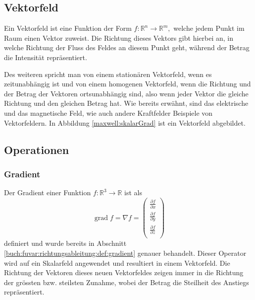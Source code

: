 \subsection{Vektorfeld\label{maxwell:vektorfeld}}

Ein Vektorfeld ist eine Funktion der Form \( f\colon \mathbb{R}^n \rightarrow \mathbb{R}^m, \) welche jedem Punkt im Raum einen Vektor zuweist. 
%
Die Richtung dieses Vektors gibt hierbei an, in welche Richtung der Fluss des Feldes an diesem Punkt geht, während der Betrag die Intensität repräsentiert.


Des weiteren spricht man von einem stationären Vektorfeld, wenn es zeitunabhängig ist und von einem homogenen Vektorfeld, wenn die Richtung und der Betrag der Vektoren ortsunabhängig sind, also wenn jeder Vektor die gleiche Richtung und den gleichen Betrag hat. 
Wie bereits erwähnt, sind das elektrische und das magnetische Feld, wie auch andere Kraftfelder Beispiele von Vektorfeldern.
In Abbildung \ref{maxwell:skalarGrad} ist ein Vektorfeld abgebildet.

\subsection{Operationen}

\subsubsection{Gradient}
%
Der Gradient einer Funktion $f:\mathbb{R}^3 \rightarrow \mathbb{R}$ ist als 
\[
\renewcommand{\arraystretch}{1.9} 
\operatorname{grad}f = \nabla f = \begin{pmatrix}
\displaystyle
\frac{\partial f}{\partial x} \\
\displaystyle
\frac{\partial f}{\partial y} \\
\displaystyle
\frac{\partial f}{\partial z} \\
\end{pmatrix}\] 
definiert und wurde bereits in Abschnitt \ref{buch:fuvar:richtungsableitung:def:gradient} genauer behandelt. Dieser Operator wird auf ein Skalarfeld angewendet und resultiert in einem Vektorfeld. 
Die Richtung der Vektoren dieses neuen Vektorfeldes zeigen immer in die Richtung der grössten bzw. steilsten Zunahme, wobei der Betrag die Steilheit des Anstiegs repräsentiert.

